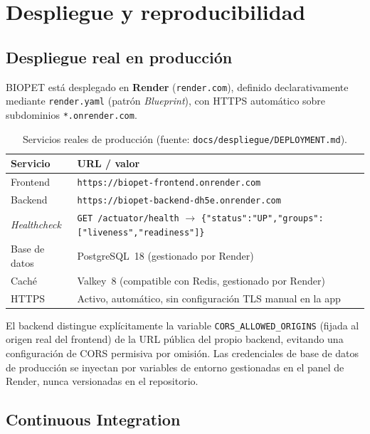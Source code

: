 \chapter{Despliegue y reproducibilidad}
\label{cap:despliegue}

\section{Despliegue real en producci\'on}

BIOPET est\'a desplegado en \textbf{Render} (\texttt{render.com}), definido
declarativamente mediante \texttt{render.yaml} (patr\'on \emph{Blueprint}),
con HTTPS autom\'atico sobre subdominios \texttt{*.onrender.com}.

\begin{table}[H]
  \centering
  \caption{Servicios reales de producci\'on (fuente: \texttt{docs/despliegue/DEPLOYMENT.md}).}
  \label{tab:produccion-final}
  \begin{tabular}{@{}ll@{}}
    \toprule
    Servicio & URL / valor \\
    \midrule
    Frontend & \texttt{https://biopet-frontend.onrender.com} \\
    Backend & \texttt{https://biopet-backend-dh5e.onrender.com} \\
    \emph{Healthcheck} & \texttt{GET /actuator/health} $\to$ \texttt{\{"status":"UP","groups":["liveness","readiness"]\}} \\
    Base de datos & PostgreSQL~18 (gestionado por Render) \\
    Cach\'e & Valkey~8 (compatible con Redis, gestionado por Render) \\
    HTTPS & Activo, autom\'atico, sin configuraci\'on TLS manual en la app \\
    \bottomrule
  \end{tabular}
\end{table}

El backend distingue expl\'icitamente la variable \texttt{CORS\_ALLOWED\_ORIGINS}
(fijada al origen real del frontend) de la URL p\'ublica del propio backend,
evitando una configuraci\'on de CORS permisiva por omisi\'on. Las
credenciales de base de datos de producci\'on se inyectan por variables de
entorno gestionadas en el panel de Render, nunca versionadas en el
repositorio.

\section{Continuous Integration}
\label{sec:ci-jobs}

